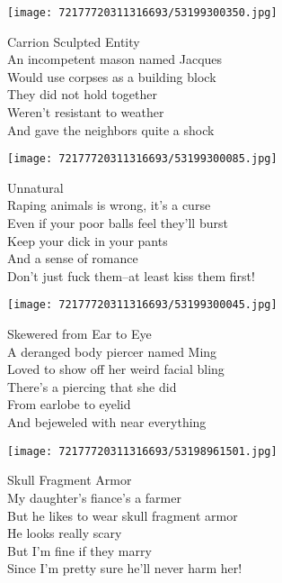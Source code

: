 \documentclass[10pt,letterpaper]{article}
\begin{document}
\begin{center}\texttt{[image: 72177720311316693/53199300350.jpg]}
\end{center}
\begin{center}
Carrion Sculpted Entity\\
\vskip 0.2in
An incompetent mason named Jacques\\
Would use corpses as a building block\\
They did not hold together\\
Weren't resistant to weather\\
And gave the neighbors quite a shock\\
\end{center}
\pagebreak

\begin{center}\texttt{[image: 72177720311316693/53199300085.jpg]}
\end{center}
\begin{center}
Unnatural\\
\vskip 0.2in
Raping animals is wrong, it's a curse\\
Even if your poor balls feel they'll burst\\
Keep your dick in your pants\\
And a sense of romance\\
Don't just fuck them--at least kiss them first!\\
\end{center}
\pagebreak

\begin{center}\texttt{[image: 72177720311316693/53199300045.jpg]}
\end{center}
\begin{center}
Skewered from Ear to Eye\\
\vskip 0.2in
A deranged body piercer named Ming\\
Loved to show off her weird facial bling\\
There's a piercing that she did\\
From earlobe to eyelid\\
And bejeweled with near everything\\
\end{center}
\pagebreak

\begin{center}\texttt{[image: 72177720311316693/53198961501.jpg]}
\end{center}
\begin{center}
Skull Fragment Armor\\
\vskip 0.2in
My daughter's fiance's a farmer\\
But he likes to wear skull fragment armor\\
He looks really scary\\
But I'm fine if they marry\\
Since I'm pretty sure he'll never harm her!\\
\end{center}
\pagebreak
\end{document}
